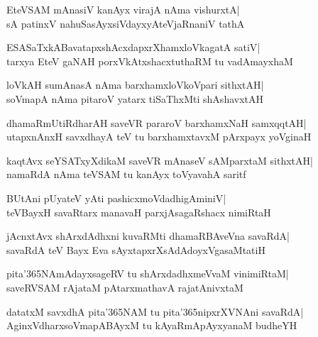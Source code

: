 \documentclass[twoside,12pt,openright]{book}
\newcounter{shloka}[chapter]
\begin{document}
\begin{shloka}%
EteVSAM mAnasiV kanAyx virajA nAma vishurxtA|\\
sA patinxV nahuSasAyxsiVdayxyAteVjaRnaniV tathA
\end{shloka}

\begin{shloka}%
ESASaTxkABavatapxshAcxdapxrXhamxloVkagatA satiV|\\
tarxya EteV gaNAH porxVkAtxshacxtuthaRM tu vadAmayxhaM
\end{shloka}

\begin{shloka}%
loVkAH sumAnasA nAma barxhamxloVkoVpari sithxtAH|\\
soVmapA nAma pitaroV yatarx tiSaThxMti shAshavxtAH
\end{shloka}

\begin{shloka}%
dhamaRmUtiRdharAH saveVR pararoV barxhamxNaH samxqqtAH|\\
utapxnAnxH savxdhayA teV tu barxhamxtavxM pArxpayx yoVginaH
\end{shloka}

\begin{shloka}%
kaqtAvx seYSATxyXdikaM saveVR mAnaseV sAMparxtaM sithxtAH|\\
namaRdA nAma teVSAM tu kanAyx toVyavahA saritf
\end{shloka}

\begin{shloka}%
BUtAni pUyateV yAti pashicxmoVdadhigAminiV|\\
teVBayxH savaRtarx manavaH parxjAsagaRshacx nimiRtaH
\end{shloka}

\begin{shloka}%
jAcnxtAvx shArxdAdhxni kuvaRMti dhamaRBAveVna savaRdA|\\
savaRdA teV Bayx Eva sAyxtapxrXsAdAdoyxVgasaMtatiH
\end{shloka}

\begin{shloka}%
pita\char'365NAmAdayxsageRV tu shArxdadhxmeVvaM vinimiRtaM|\\
saveRVSAM rAjataM pAtarxmathavA rajatAnivxtaM
\end{shloka}

\begin{shloka}%
datatxM savxdhA pita\char'365NAM tu pita\char'365nipxrXVNAni
savaRdA|\\
AginxVdharxsoVmapABAyxM tu kAyaRmApAyxyanaM budheYH
\end{shloka}
\end{document}
